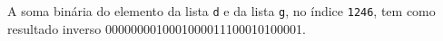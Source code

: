\documentclass[12pt,varwidth=16cm,border=1pt]{standalone}
\begin{document}
A soma binária do elemento da lista \verb+d+ e da lista \verb+g+, no índice \verb+1246+, tem como resultado inverso 0000000010001000011100010100001.

\questiomfalse
\end{document}
